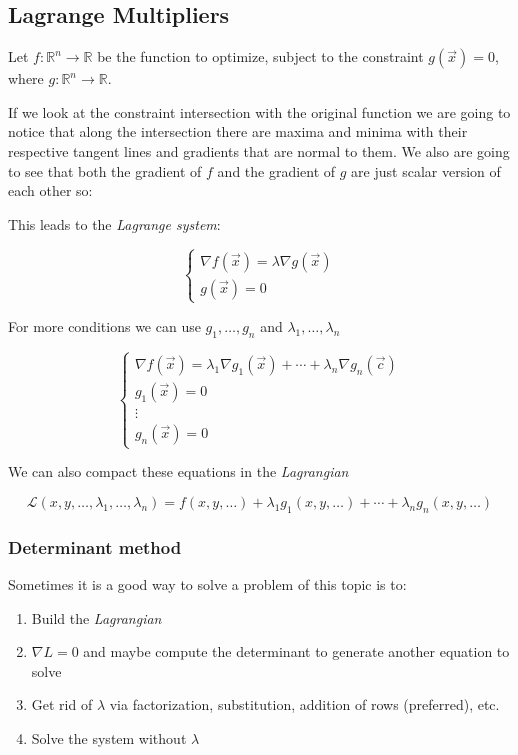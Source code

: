 \subsection{Lagrange Multipliers}

Let \( f : \mathbb{R}^n \to \mathbb{R} \) be the function to optimize, subject to the constraint \( g(\vec{x}) = 0 \), where \( g : \mathbb{R}^n \to \mathbb{R} \).  

If we look at the constraint intersection with the original function we are going to notice that along the intersection
there are maxima and minima with their respective tangent lines
and gradients that are normal to them. We also are going to see that both the gradient of \(f\) and 
the gradient of \(g\) are just scalar version of each other so: 

This leads to the \emph{Lagrange system}:

\[
\begin{cases}
\nabla f(\vec{x}) = \lambda \nabla g(\vec{x}) \\
g(\vec{x}) = 0
\end{cases}
\]

For more conditions  we can use \(g_1, \dots, g_n\) and \(\lambda_1, \dots, \lambda_n\)

\[
\begin{cases}
\nabla f(\vec{x}) = \lambda_1 \nabla g_1(\vec{x}) + \cdots + \lambda_n \nabla g_n(\vec{c}) \\
g_1(\vec{x}) = 0 \\
\vdots \\
g_n(\vec{x}) = 0
\end{cases}
\]


We can also compact these equations in the \emph{Lagrangian}

\[
\mathcal{L}(x,y, \dots, \lambda_1, \dots, \lambda_n) = f(x, y, \dots) + \lambda_1 g_1(x, y, \dots) + \cdots + \lambda_n g_n(x, y, \dots)
\]

\subsubsection{Determinant method}

Sometimes it is a good way to solve a problem of this topic is to:

\begin{enumerate}
    \item Build the \emph{Lagrangian}
    \item \(\nabla L = 0\) and maybe compute the determinant to generate another equation to solve
    \item Get rid of \(\lambda\) via factorization, substitution, addition of rows (preferred), etc.
    \item Solve the system without \(\lambda\)
\end{enumerate}

